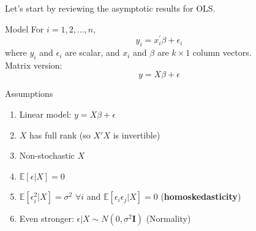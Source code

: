 \begin{frame}
Let's start by reviewing the asymptotic results for OLS.

\begin{block}{Model}
For $i=1,2,\ldots,n$, $$y_{i}=x_{i}^{\prime}\beta+\epsilon_{i}$$
where $y_{i}$ and $\epsilon_{i}$ are scalar, and $x_{i}$ and $\beta$ are $k\times 1$ column vectors.\\
Matrix version:
$$
    y = X\beta + \epsilon
$$
\end{block}

\begin{block}{Assumptions}
    \begin{enumerate}
        \item Linear model: $y=X\beta + \epsilon$
        \item $X$ has full rank (so $X'X$ is invertible)
        \item Non-stochastic $X$
        \item $\mathbb{E}[\epsilon|X]=0$
        \item $\mathbb{E}[\epsilon_i^2|X]=\sigma^2$ $\forall i$ and $\mathbb{E}[\epsilon_i\epsilon_j|X]=0$ (\textbf{homoskedasticity})
        \item Even stronger: $\epsilon|X \sim N(0,\sigma^2\mathbf{I})$ (Normality)
    \end{enumerate}
\end{block}



\end{frame}

